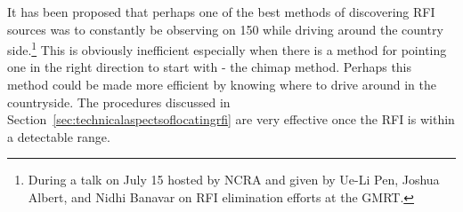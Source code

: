 \documentclass[a4paper,12pt]{article}
\begin{document}
                                                                                                                                                                                                                                                                                                                                                                                                                                                                                                                                                                                                                                                                                                                                                                                                                                                                                                                                                                                                                                                                                                                                                                                                                                                                                                                                                                                                                                                                                                                                                                                                                                                                                                                                                                                                                                                                                         It has been proposed that perhaps one of the best methods of discovering RFI sources was to constantly be observing on \unit{150}{\mega\hertz} while driving around the country side.\footnote{During a talk on July 15 hosted by NCRA and given by Ue-Li Pen, Joshua Albert, and Nidhi Banavar on RFI elimination efforts at the GMRT.} This is obviously inefficient especially when there is a method for pointing one in the right direction to start with - the chimap method. Perhaps this method could be made more efficient by knowing where to drive around in the countryside. The procedures discussed in Section~\ref{sec:technicalaspectsoflocatingrfi} are very effective once the RFI is within a detectable range. 
\end{document}
